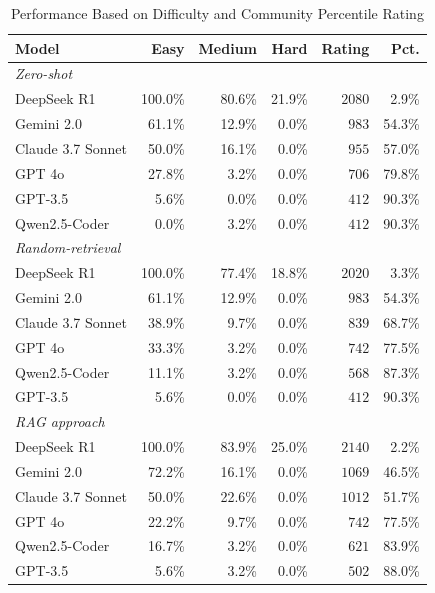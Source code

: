 \documentclass[preprint,12pt]{elsarticle}
\begin{document}
\begin{table}[ht]
\centering
\caption{Performance Based on Difficulty and Community Percentile Rating}
\label{tab:model_percentile}
\begin{tabular}{@{}lrrrrr@{}}
\toprule
\textbf{Model} & \textbf{Easy} & \textbf{Medium} & \textbf{Hard} & \textbf{Rating} & \textbf{Pct.} \\
\midrule
\textit{Zero-shot} & & & & & \\
DeepSeek R1       & 100.0\%& 80.6\% & 21.9\% & $2080$ & 2.9\% \\
Gemini 2.0        & 61.1\% & 12.9\% & 0.0\%  & $983$  & 54.3\% \\
Claude 3.7 Sonnet & 50.0\% & 16.1\% & 0.0\%  & $955$  & 57.0\% \\
GPT 4o            & 27.8\% & 3.2\%  & 0.0\%  & $706$  & 79.8\% \\
GPT-3.5           & 5.6\%  & 0.0\%  & 0.0\%  & $412$ & 90.3\% \\
Qwen2.5-Coder     & 0.0\%  & 3.2\%  & 0.0\%  & $412$ & 90.3\% \\
\midrule
\textit{Random-retrieval} & & & & & \\
DeepSeek R1       & 100.0\%& 77.4\% & 18.8\% & $2020$ & 3.3\% \\
Gemini 2.0        & 61.1\% & 12.9\% & 0.0\%  & $983$  & 54.3\% \\
Claude 3.7 Sonnet & 38.9\% & 9.7\%  & 0.0\%  & $839$  & 68.7\% \\
GPT 4o            & 33.3\% & 3.2\%  & 0.0\%  & $742$  & 77.5\% \\
Qwen2.5-Coder     & 11.1\% & 3.2\%  & 0.0\%  & $568$  & 87.3\% \\
GPT-3.5           & 5.6\%  & 0.0\%  & 0.0\%  & $412$ & 90.3\% \\
\midrule
\textit{RAG approach} & & & & & \\
DeepSeek R1       & 100.0\%& 83.9\% & 25.0\% & $2140$ & 2.2\% \\
Gemini 2.0        & 72.2\% & 16.1\% & 0.0\%  & $1069$ & 46.5\% \\
Claude 3.7 Sonnet & 50.0\% & 22.6\% & 0.0\%  & $1012$ & 51.7\% \\
GPT 4o            & 22.2\% & 9.7\%  & 0.0\%  & $742$  & 77.5\% \\
Qwen2.5-Coder     & 16.7\% & 3.2\%  & 0.0\%  & $621$  & 83.9\% \\
GPT-3.5           & 5.6\%  & 3.2\%  & 0.0\%  & $502$ & 88.0\% \\
\bottomrule
\end{tabular}
\end{table}
\end{document}
